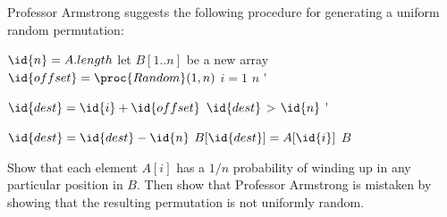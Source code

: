 Professor Armstrong suggests the following procedure for generating a 
uniform random permutation:
\newcommand{\Doo}{\>\textbf{}\hspace*{-0.7em}\'\addtocounter{indent}{1}}
\begin{codebox}
    \li $\id{n} = A.length$
    \li let $B[1..n]$ be a new array
    \li $\id{offset} = \proc{Random}(1,n)$
    \li \For $i = 1$ \To $n$
    \li     \Doo $\id{dest} = \id{i} + \id{offset}$
    \li     \If $\id{dest}$ > $\id{n}$
    \li         \Doo $\id{dest} = \id{dest} - \id{n}$
                \End
    \li         $B[\id{dest}] = A[\id{i}]$
            \End
    \li \Return $B$
\end{codebox}
Show that each element $A[i]$ has a $1/n$ probability of winding up in any particular 
position in $B$. Then show that Professor Armstrong is mistaken by showing that the 
resulting permutation is not uniformly random.

